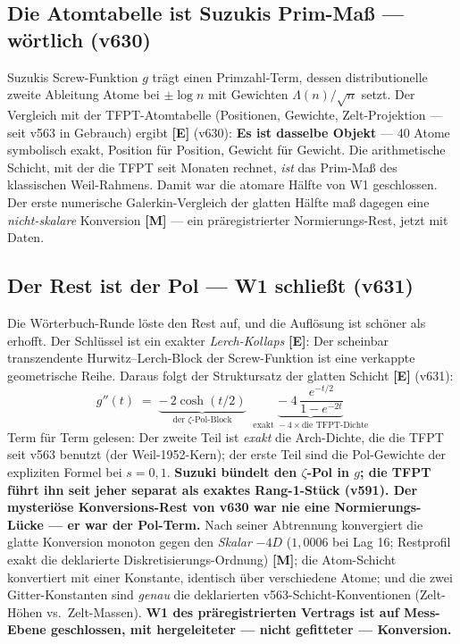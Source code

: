\documentclass[11pt,a4paper]{article}
\newcommand{\E}{\textcolor{gut}{\textbf{[E]}}}
\newcommand{\M}{\textcolor{mess}{\textbf{[M]}}}
\begin{document}
\subsection*{Die Atomtabelle ist Suzukis Prim-Maß --- wörtlich (v630)}

Suzukis Screw-Funktion $g$ trägt einen Primzahl-Term, dessen
distributionelle zweite Ableitung Atome bei $\pm\log n$ mit
Gewichten $\Lambda(n)/\sqrt{n}$ setzt. Der Vergleich mit der
TFPT-Atomtabelle (Positionen, Gewichte, Zelt-Projektion --- seit v563
in Gebrauch) ergibt \E{} (v630): \textbf{Es ist dasselbe Objekt} ---
40 Atome symbolisch exakt, Position für Position, Gewicht für
Gewicht. Die arithmetische Schicht, mit der die TFPT seit Monaten
rechnet, \emph{ist} das Prim-Maß des klassischen Weil-Rahmens. Damit
war die atomare Hälfte von W1 geschlossen. Der erste numerische
Galerkin-Vergleich der glatten Hälfte maß dagegen eine
\emph{nicht-skalare} Konversion \M{} --- ein präregistrierter
Normierungs-Rest, jetzt mit Daten.

\subsection*{Der Rest ist der Pol --- W1 schließt (v631)}

Die Wörterbuch-Runde löste den Rest auf, und die Auflösung ist
schöner als erhofft. Der Schlüssel ist ein exakter
\emph{Lerch-Kollaps} \E{}: Der scheinbar transzendente
Hurwitz--Lerch-Block der Screw-Funktion ist eine verkappte
geometrische Reihe. Daraus folgt der Struktursatz der glatten
Schicht \E{} (v631):
\[
g''(t) \;=\; \underbrace{-\,2\cosh(t/2)}_{\text{der } \zeta\text{-Pol-Block}}
\;\; \underbrace{-\; 4\,\frac{e^{-t/2}}{1 - e^{-2t}}}_{\text{exakt } -4\times\text{die TFPT-Dichte}}
\]
Term für Term gelesen: Der zweite Teil ist \emph{exakt} die
Arch-Dichte, die die TFPT seit v563 benutzt (der Weil-1952-Kern);
der erste Teil sind die Pol-Gewichte der expliziten Formel bei
$s = 0, 1$. \textbf{Suzuki bündelt den $\zeta$-Pol in $g$; die TFPT
führt ihn seit jeher separat als exaktes Rang-1-Stück (v591). Der
mysteriöse Konversions-Rest von v630 war nie eine Normierungs-Lücke
--- er war der Pol-Term.} Nach seiner Abtrennung konvergiert die
glatte Konversion monoton gegen den \emph{Skalar} $-4D$ ($1{,}0006$
bei Lag 16; Restprofil exakt die deklarierte
Diskretisierungs-Ordnung) \M{}; die Atom-Schicht konvertiert mit
einer Konstante, identisch über verschiedene Atome; und die zwei
Gitter-Konstanten sind \emph{genau} die deklarierten
v563-Schicht-Konventionen (Zelt-Höhen vs.\ Zelt-Massen).
\textbf{W1 des präregistrierten Vertrags ist auf Mess-Ebene
geschlossen, mit hergeleiteter --- nicht gefitteter --- Konversion.}
\end{document}

